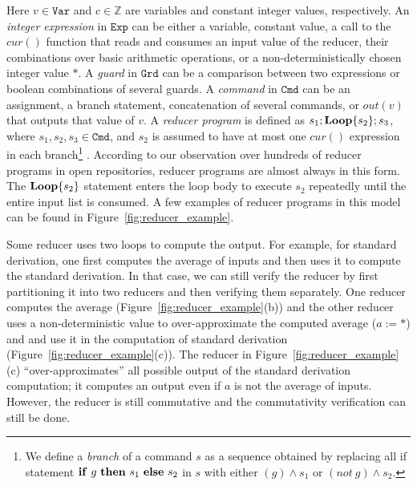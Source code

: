 \documentclass{llncs}
\newcommand{\Var}{\mathtt{Var}}
\newcommand{\Exp}{\mathtt{Exp}}
\newcommand{\Cmd}{\mathtt{Cmd}}
\newcommand{\Grd}{\mathtt{Grd}}
\newcommand{\cur}{cur()}
\newcommand{\ite}[3]{
	 \ifmmode
	 \mathbf{if}\ #1 \ \mathbf{then}\ #2\  \mathbf{else}\ #3
	 \else
	 \textbf{if}\ #1 \ \textbf{then}\ #2\  \textbf{else}\ #3
	 \fi}
\newcommand{\rloop}{
	\ifmmode
	\mathbf{Loop}
	\else
	\textbf{Loop}
	\fi}
\newcommand{\Z}{\mathbb{Z}}
\begin{document}
Here $v\in \Var$ and $c \in \Z$ are variables and constant integer values, respectively. An \emph{integer expression} in $\Exp$ can be either a variable, constant value, a call to the $\cur$ function that reads and consumes an input value of the reducer, their combinations over basic arithmetic operations, or a non-deterministically chosen integer value $*$.
A \emph{guard} in $\Grd$ can be a comparison between two expressions or boolean combinations of several guards. A \emph{command} in $\Cmd$ can be an assignment, a branch statement, concatenation of several commands, or $out(v)$ that outputs that value of $v$.
A \emph{reducer program} is defined as $s_1;\rloop\{s_2\};s_3$, where $s_1,s_2,s_3 \in \Cmd$, and $s_2$ is assumed to have at most one $\cur$ expression in each branch\footnote{We define a \emph{branch} of a command $s$ as a sequence obtained by replacing all if statement $\ite{g}{s_1}{s_2}$ in $s$ with either $(g)\wedge s_1$ or $(not\ g) \wedge s_2$.} . According to our observation over hundreds  of reducer programs in open repositories, reducer programs are almost always in this form. The $\rloop\{s_2\}$ statement enters the loop body to execute $s_2$ repeatedly until the entire input list is consumed. A few examples of reducer programs in this model can be found in Figure~\ref{fig:reducer_example}.


Some reducer uses two loops to compute the output. For example, for standard derivation, one first computes the average of inputs and then uses it to compute the standard derivation. In that case, we can still verify the reducer by first partitioning it into two reducers and then verifying them separately. One reducer computes the average (Figure~\ref{fig:reducer_example}(b)) and the other reducer uses a non-deterministic value to over-approximate the computed average ($a := *$) and and use it in the computation of standard derivation (Figure~\ref{fig:reducer_example}(c)). The reducer in Figure~\ref{fig:reducer_example}(c) ``over-approximates''  all possible output of the standard derivation computation; it computes an output even if $a$ is not the average of inputs. However, the reducer is still commutative and the commutativity verification can still be done.
\end{document}
